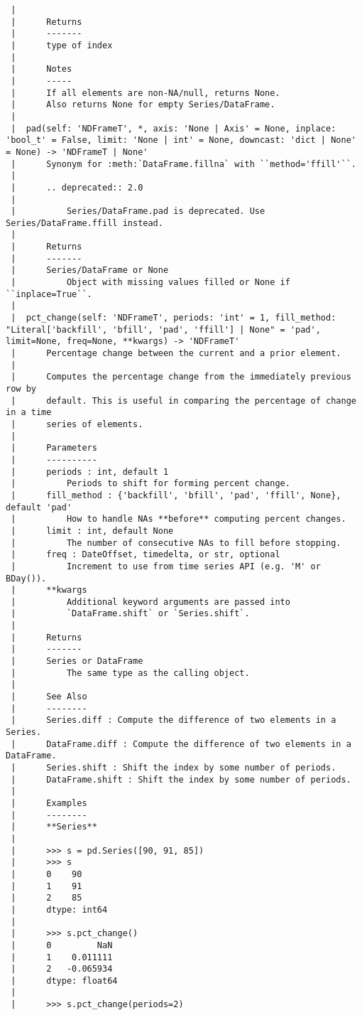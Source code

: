 \documentclass[
  letterpaper,
  DIV=11,
  numbers=noendperiod]{scrreprt}
\begin{document}
\begin{verbatim}
 |      
 |      Returns
 |      -------
 |      type of index
 |      
 |      Notes
 |      -----
 |      If all elements are non-NA/null, returns None.
 |      Also returns None for empty Series/DataFrame.
 |  
 |  pad(self: 'NDFrameT', *, axis: 'None | Axis' = None, inplace: 'bool_t' = False, limit: 'None | int' = None, downcast: 'dict | None' = None) -> 'NDFrameT | None'
 |      Synonym for :meth:`DataFrame.fillna` with ``method='ffill'``.
 |      
 |      .. deprecated:: 2.0
 |      
 |          Series/DataFrame.pad is deprecated. Use Series/DataFrame.ffill instead.
 |      
 |      Returns
 |      -------
 |      Series/DataFrame or None
 |          Object with missing values filled or None if ``inplace=True``.
 |  
 |  pct_change(self: 'NDFrameT', periods: 'int' = 1, fill_method: "Literal['backfill', 'bfill', 'pad', 'ffill'] | None" = 'pad', limit=None, freq=None, **kwargs) -> 'NDFrameT'
 |      Percentage change between the current and a prior element.
 |      
 |      Computes the percentage change from the immediately previous row by
 |      default. This is useful in comparing the percentage of change in a time
 |      series of elements.
 |      
 |      Parameters
 |      ----------
 |      periods : int, default 1
 |          Periods to shift for forming percent change.
 |      fill_method : {'backfill', 'bfill', 'pad', 'ffill', None}, default 'pad'
 |          How to handle NAs **before** computing percent changes.
 |      limit : int, default None
 |          The number of consecutive NAs to fill before stopping.
 |      freq : DateOffset, timedelta, or str, optional
 |          Increment to use from time series API (e.g. 'M' or BDay()).
 |      **kwargs
 |          Additional keyword arguments are passed into
 |          `DataFrame.shift` or `Series.shift`.
 |      
 |      Returns
 |      -------
 |      Series or DataFrame
 |          The same type as the calling object.
 |      
 |      See Also
 |      --------
 |      Series.diff : Compute the difference of two elements in a Series.
 |      DataFrame.diff : Compute the difference of two elements in a DataFrame.
 |      Series.shift : Shift the index by some number of periods.
 |      DataFrame.shift : Shift the index by some number of periods.
 |      
 |      Examples
 |      --------
 |      **Series**
 |      
 |      >>> s = pd.Series([90, 91, 85])
 |      >>> s
 |      0    90
 |      1    91
 |      2    85
 |      dtype: int64
 |      
 |      >>> s.pct_change()
 |      0         NaN
 |      1    0.011111
 |      2   -0.065934
 |      dtype: float64
 |      
 |      >>> s.pct_change(periods=2)

\end{verbatim}
\end{document}
